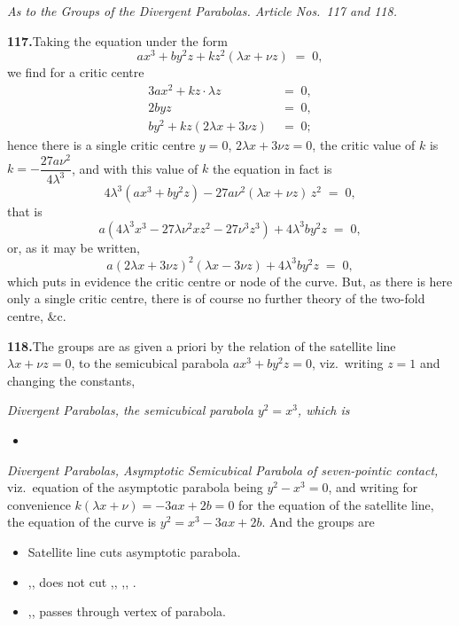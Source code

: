 \documentclass[11pt]{article}
\begin{document}
\bigskip
\noindent\textit{As to the Groups of the Divergent Parabolas. Article Nos.~117 and 118.}

\medskip
\textbf{117.}\quad Taking the equation under the form
\[
a x^{3} + b y^{2} z + k z^{2}(\lambda x + \nu z) \;=\; 0,
\]
we find for a critic centre
\begin{align*}
3 a x^{2} + k z \cdot \lambda z &\;=\; 0,\\
2 b y z &\;=\; 0,\\
b y^{2} + k z(2 \lambda x + 3 \nu z) &\;=\; 0;
\end{align*}
hence there is a single critic centre $y = 0$, $2\lambda x + 3 \nu z = 0$, the critic value of $k$ is $k = -\dfrac{27 a \nu^{2}}{4 \lambda^{3}}$, and with this value of $k$ the equation in fact is
\[
4\lambda^{3}(a x^{3} + b y^{2} z) - 27 a \nu^{2}(\lambda x + \nu z)\, z^{2} \;=\; 0,
\]
that is
\[
a(4\lambda^{3} x^{3} - 27 \lambda \nu^{2} x z^{2} - 27 \nu^{3} z^{3}) + 4 \lambda^{3} b y^{2} z \;=\; 0,
\]
or, as it may be written,
\[
a(2 \lambda x + 3 \nu z)^{2}(\lambda x - 3 \nu z) + 4 \lambda^{3} b y^{2} z \;=\; 0,
\]
which puts in evidence the critic centre or node of the curve. But, as there is here only a single critic centre, there is of course no further theory of the two-fold centre, \&c.

\medskip
\textbf{118.}\quad The groups are as given a priori by the relation of the satellite line $\lambda x + \nu z = 0$, to the semicubical parabola $a x^{3} + b y^{2} z = 0$, viz.\ writing $z = 1$ and changing the constants,
\smallskip

\noindent\emph{Divergent Parabolas, the semicubical parabola $y^{2} = x^{3}$, which is}
\begin{itemize}\itemsep0pt
\item[LV.]
\end{itemize}

\noindent\emph{Divergent Parabolas, Asymptotic Semicubical Parabola of seven-pointic contact,} viz.\ equation of the asymptotic parabola being $y^{2} - x^{3} = 0$, and writing for convenience $k(\lambda x + \nu) = -3 a x + 2 b = 0$ for the equation of the satellite line, the equation of the curve is $y^{2} = x^{3} - 3 a x + 2 b$. And the groups are
\begin{itemize}\itemsep0pt
\item[LVI.] Satellite line cuts asymptotic parabola.
\item[LVII.] ,, does not cut ,, ,, .
\item[LVIII.] ,, passes through vertex of parabola.
\end{itemize}
\end{document}

